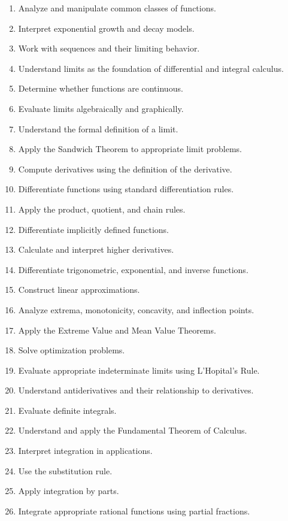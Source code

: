 \documentclass[11pt]{article}
\begin{document}
\begin{enumerate}
    \item Analyze and manipulate common classes of functions.
    \item Interpret exponential growth and decay models.
    \item Work with sequences and their limiting behavior.
    \item Understand limits as the foundation of differential and integral calculus.
    \item Determine whether functions are continuous.
    \item Evaluate limits algebraically and graphically.
    \item Understand the formal definition of a limit.
    \item Apply the Sandwich Theorem to appropriate limit problems.
    \item Compute derivatives using the definition of the derivative.
    \item Differentiate functions using standard differentiation rules.
    \item Apply the product, quotient, and chain rules.
    \item Differentiate implicitly defined functions.
    \item Calculate and interpret higher derivatives.
    \item Differentiate trigonometric, exponential, and inverse functions.
    \item Construct linear approximations.
    \item Analyze extrema, monotonicity, concavity, and inflection points.
    \item Apply the Extreme Value and Mean Value Theorems.
    \item Solve optimization problems.
    \item Evaluate appropriate indeterminate limits using L'Hopital's Rule.
    \item Understand antiderivatives and their relationship to derivatives.
    \item Evaluate definite integrals.
    \item Understand and apply the Fundamental Theorem of Calculus.
    \item Interpret integration in applications.
    \item Use the substitution rule.
    \item Apply integration by parts.
    \item Integrate appropriate rational functions using partial fractions.
\end{enumerate}
\end{document}
